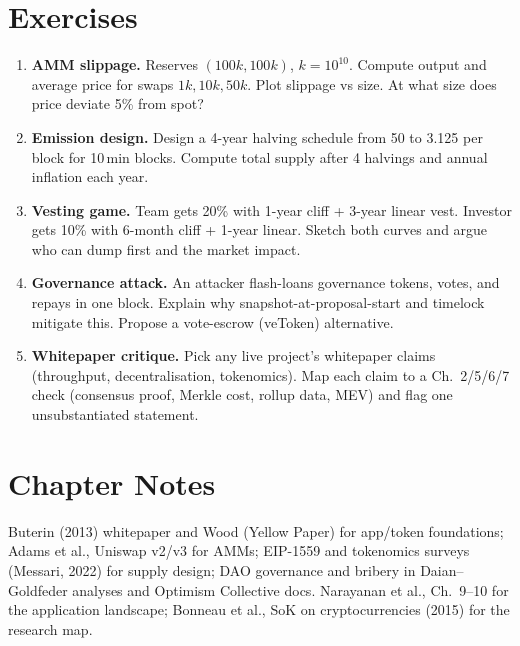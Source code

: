 \section{Exercises}\label{sec:ch08-exercises}
\begin{enumerate}[label=E8.\arabic*, leftmargin=*, itemsep=0.6em]
    \item \textbf{AMM slippage.} Reserves $(100k,100k)$, $k=10^{10}$. Compute output and average price for swaps $1k,10k,50k$. Plot slippage vs size. At what size does price deviate 5\% from spot?
    \item \textbf{Emission design.} Design a 4-year halving schedule from 50 to 3.125 per block for 10\,min blocks. Compute total supply after 4 halvings and annual inflation each year.
    \item \textbf{Vesting game.} Team gets 20\% with 1-year cliff + 3-year linear vest. Investor gets 10\% with 6-month cliff + 1-year linear. Sketch both curves and argue who can dump first and the market impact.
    \item \textbf{Governance attack.} An attacker flash-loans governance tokens, votes, and repays in one block. Explain why snapshot-at-proposal-start and timelock mitigate this. Propose a vote-escrow (veToken) alternative.
    \item \textbf{Whitepaper critique.} Pick any live project's whitepaper claims (throughput, decentralisation, tokenomics). Map each claim to a Ch.~2/5/6/7 check (consensus proof, Merkle cost, rollup data, MEV) and flag one unsubstantiated statement.
\end{enumerate}

\section*{Chapter Notes}
Buterin (2013) whitepaper and Wood (Yellow Paper) for app/token foundations; Adams et al., Uniswap v2/v3 for AMMs; EIP-1559 and tokenomics surveys (Messari, 2022) for supply design; DAO governance and bribery in Daian--Goldfeder analyses and Optimism Collective docs. Narayanan et al., Ch.~9--10 for the application landscape; Bonneau et al., SoK on cryptocurrencies (2015) for the research map.
